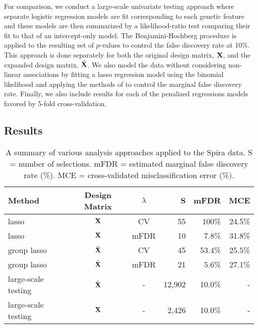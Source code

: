 For comparison, we conduct a large-scale univariate testing approach where separate logistic regression models are fit corresponding to each genetic feature and these models are then summarized by a likelihood-ratio test comparing their fit to that of an intercept-only model. The Benjamini-Hochberg procedure is applied to the resulting set of $p$-values to control the false discovery rate at 10\%. This approach is done separately for both the original design matrix, $\mathbf{X}$, and the expanded design matrix, $\tilde{\mathbf{X}}$. We also model the data without considering non-linear associations by fitting a lasso regression model using the binomial likelihood and applying the methods of \citet{Miller2019} to control the marginal false discovery rate. Finally, we also include results for each of the penalized regressions models favored by 5-fold cross-validation.

\subsection{Results}

\begin{table}[htb!]
\centering
\caption{\label{Tab:case-studies} A summary of various analysis approaches applied to the Spira data. S = number of selections. mFDR = estimated marginal false discovery rate (\%). MCE = cross-validated misclassification error (\%).}
\vspace{.2cm}
\begin{tabular}{l c c r r r}
\hline
Method & Design Matrix & $\lambda$ & S & mFDR & MCE \\
\hline
lasso & $\mathbf{X}$ & CV & 55 & 100\% & 24.5\% \\
lasso & $\mathbf{X}$ & mFDR & 10 & 7.8\% & 31.8\% \\
group lasso & $\tilde{\mathbf{X}}$ & CV & 45 & 53.4\% & 25.5\% \\
group lasso & $\tilde{\mathbf{X}}$ & mFDR & 21 & 5.6\% & 27.1\% \\
large-scale testing & $\tilde{\mathbf{X}}$ & - & 12,902 & 10.0\% & - \\
large-scale testing & $\mathbf{X}$ & - & 2,426 & 10.0\% & - \\
\hline
\end{tabular}
\end{table}

